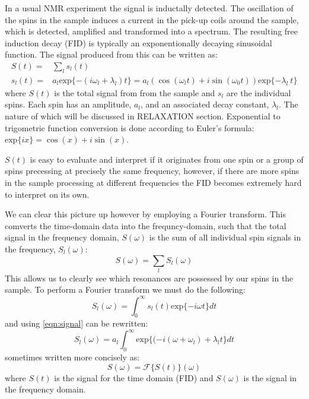In a usual NMR experiment the signal is inductally detected. The oscillation of the spins in the sample induces
a current in the pick-up coils around the sample, which is detected, amplified and transformed into a spectrum.
The resulting free induction decay (FID) is typically an exponentionally decaying sinusoidal function. The signal
produced from this can be written as:
\begin{align}\label{eqn:signal}
  S(t) =& \sum_l s_l(t) \\
  s_l(t) =& a_l\text{exp}\{-(i\omega_l+\lambda_l)t\} = a_l(\cos(\omega_lt) + i\sin(\omega_0t))\text{exp}\{-\lambda_l~t\}
\end{align}
where $S(t)$ is the total signal from from the sample and $s_l$ are the individual spins. Each spin has an amplitude, $a_l$, and an associated decay constant, $\lambda_l$. The nature of which will be discussed in RELAXATION section. Exponential to trigometric function conversion
is done according to Euler's formula: $\text{exp}\{ix\} = \cos(x) + i\sin(x)$.

$S(t)$ is easy to evaluate and interpret if it originates from one spin or a group of spins precessing
at precisely the same frequency, however, if there are more spins in the sample processing at different frequencies
the FID becomes extremely hard to interpret on its own.

We can clear this picture up however by employing a Fourier transform. This comverts the time-domain data
into the frequncy-domain, such that the total signal in the frequency domain, $S(\omega)$ is the sum of all individual spin signals in the frequency, $S_l(\omega)$:
\begin{equation}
  S(\omega) = \sum_l S_l(\omega)
\end{equation}
This allows us to clearly see which resonances are possessed by our spins in the sample. To
perform a Fourier transform we must do the following:
\begin{equation}
  S_l(\omega) = \int_{0}^{\infty}s_l(t)\text{exp}\{-i\omega t\}dt
\end{equation}
and using \ref{eqn:signal} can be rewritten:
\begin{equation}
  S_l(\omega) = a_l\int_{0}^{\infty}\text{exp}\{(-i(\omega+\omega_l)+\lambda_l t\}dt
\end{equation}
sometimes written more concisely as:
\begin{equation}
  S(\omega) = \mathcal{F}\{S(t)\}(\omega)
\end{equation}
where $S(t)$ is the signal for the time domain (FID) and $S(\omega)$ is the signal in the frequency domain.

